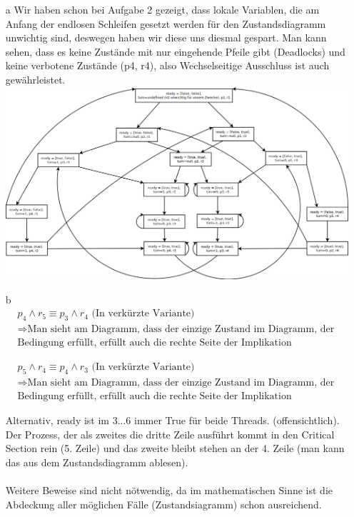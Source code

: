 \begin{itemize}

\item[a]
Wir haben schon bei Aufgabe 2 gezeigt, dass lokale Variablen, die am Anfang der endlosen Schleifen gesetzt werden für den Zustandsdiagramm unwichtig sind, deswegen haben wir diese uns diesmal gespart. 
Man kann sehen, dass es keine Zustände mit nur eingehende Pfeile gibt (Deadlocks) und keine verbotene Zustände (p4, r4), also Wechselseitige Ausschluss ist auch gewährleistet. \\

\includegraphics[width=\textwidth]{./exercise3/exercise3.png}

\item[b]
\begin{align*}
	& p_4 \land r_5 \equiv p_3 \land r_4 \text{ (In verkürzte Variante)} \\
	& \Rightarrow \text{Man sieht am Diagramm, dass der einzige Zustand im Diagramm, der diese} \\
	&	\text{Bedingung erfüllt, erfüllt auch die rechte Seite der Implikation}
\end{align*}

\begin{align*}
	& p_5 \land r_4 \equiv p_4 \land r_3 \text{ (In verkürzte Variante)} \\
	& \Rightarrow \text{Man sieht am Diagramm, dass der einzige Zustand im Diagramm, der diese} \\
	&	\text{Bedingung erfüllt, erfüllt auch die rechte Seite der Implikation}
\end{align*}

Alternativ, ready ist im {3...6} immer True für beide Threads. (offensichtlich). Der Prozess, der als zweites die dritte Zeile ausführt kommt
in den Critical Section rein (5. Zeile) und das zweite bleibt stehen an der 4. Zeile (man kann das aus dem Zustandsdiagramm ablesen). \\ \\

Weitere Beweise sind nicht nötwendig, da im mathematischen Sinne ist die Abdeckung aller möglichen Fälle (Zustandsiagramm) schon ausreichend.

\end{itemize}




